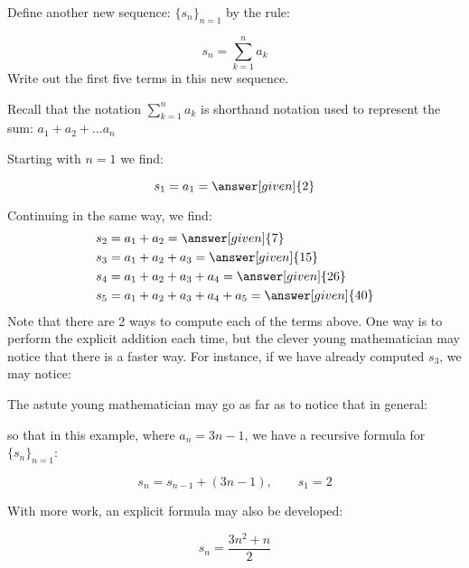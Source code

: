 \documentclass{ximera}
\begin{document}
\begin{example}
Define another new sequence: $\{s_n\}_{n=1}$ by the rule:

\[
s_n = \sum_{k=1}^n a_k 
\]
Write out the first five terms in this new sequence.

Recall that the notation $\sum_{k=1}^n a_k$ is shorthand notation used to represent the sum: $a_1+a_2+\ldots a_n$



\begin{explanation}
Starting with $n=1$ we find:

\[      s_1 = a_1 = \answer[given]{2}       \]
      
Continuing in the same way, we find:     
     \begin{align*}
      	s_2 &=  a_1 +a_2 = \answer[given]{7}  \\ 
	s_3 &=  a_1 +a_2 + a_3 = \answer[given]{15}   \\ 
	s_4 &=  a_1 +a_2 +a_3 +a_4= \answer[given]{26}  \\ 
	s_5 &=  a_1 +a_2 +a_3+a_4+a_5= \answer[given]{40}    
    \end{align*}
Note that there are 2 ways to compute each of the terms above.  One way is to perform the explicit addition each time, but the clever young mathematician may notice that there is a faster way.  For instance, if we have already computed $s_3$, we may notice:

\begin{image}
  \end{image}

The astute young mathematician may go as far as to notice that in general:

\begin{image}
  \end{image}
so that in this example, where $a_n = 3n-1$, we have a recursive formula for $\{s_n\}_{n=1}$:

\[
s_n = s_{n-1} + (3n-1), \qquad s_1 =2
\]  

With more work, an explicit formula may also be developed:

\[
s_n = \frac{3n^2+n}{2}
\]
    
\end{explanation}
\end{example}   
\end{document}
